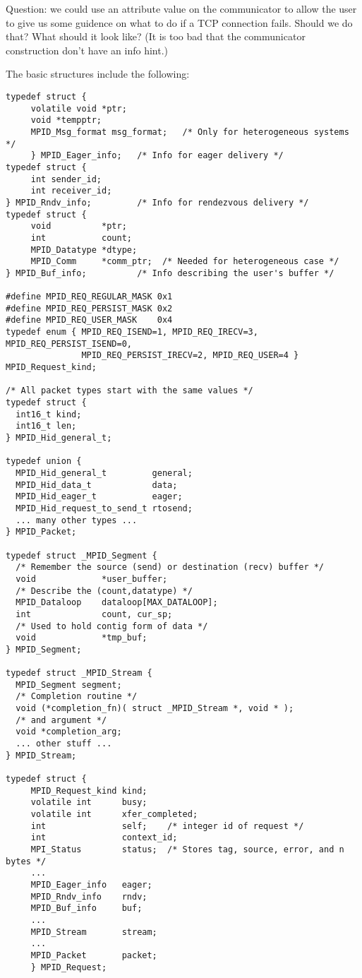 Question: we could use an attribute value on the communicator to allow
the user to give us some guidence on what to do if a TCP connection
fails.  Should we do that?  What should it look like? (It is too bad
that the communicator construction don't have an info hint.)

The basic structures include the following:
\begin{verbatim}
typedef struct { 
     volatile void *ptr;
     void *tempptr;
     MPID_Msg_format msg_format;   /* Only for heterogeneous systems */
     } MPID_Eager_info;   /* Info for eager delivery */
typedef struct { 
     int sender_id;
     int receiver_id;
} MPID_Rndv_info;         /* Info for rendezvous delivery */
typedef struct {
     void          *ptr;
     int           count;
     MPID_Datatype *dtype;
     MPID_Comm     *comm_ptr;  /* Needed for heterogeneous case */
} MPID_Buf_info;          /* Info describing the user's buffer */

#define MPID_REQ_REGULAR_MASK 0x1
#define MPID_REQ_PERSIST_MASK 0x2
#define MPID_REQ_USER_MASK    0x4
typedef enum { MPID_REQ_ISEND=1, MPID_REQ_IRECV=3, MPID_REQ_PERSIST_ISEND=0,
               MPID_REQ_PERSIST_IRECV=2, MPID_REQ_USER=4 } MPID_Request_kind;

/* All packet types start with the same values */
typedef struct {
  int16_t kind;
  int16_t len;
} MPID_Hid_general_t;

typedef union {
  MPID_Hid_general_t         general;
  MPID_Hid_data_t            data;
  MPID_Hid_eager_t           eager;
  MPID_Hid_request_to_send_t rtosend;
  ... many other types ...
} MPID_Packet;

typedef struct _MPID_Segment {
  /* Remember the source (send) or destination (recv) buffer */
  void             *user_buffer;
  /* Describe the (count,datatype) */
  MPID_Dataloop    dataloop[MAX_DATALOOP];
  int              count, cur_sp;
  /* Used to hold contig form of data */
  void             *tmp_buf;  
} MPID_Segment;

typedef struct _MPID_Stream {
  MPID_Segment segment;
  /* Completion routine */
  void (*completion_fn)( struct _MPID_Stream *, void * );
  /* and argument */
  void *completion_arg;
  ... other stuff ...
} MPID_Stream;

typedef struct {
     MPID_Request_kind kind;
     volatile int      busy;
     volatile int      xfer_completed;
     int               self;    /* integer id of request */
     int               context_id;
     MPI_Status        status;  /* Stores tag, source, error, and n bytes */
     ...
     MPID_Eager_info   eager;
     MPID_Rndv_info    rndv;
     MPID_Buf_info     buf;
     ...
     MPID_Stream       stream;
     ...
     MPID_Packet       packet;
     } MPID_Request;
\end{verbatim}

